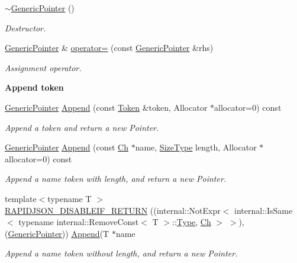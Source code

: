 \begin{Indent}
\begin{DoxyCompactItemize}
\mbox{\label{a02232_acf3eb2f7c4ebf9256f638aafa17534cb}} 
\hyperlink{a02232_acf3eb2f7c4ebf9256f638aafa17534cb}{$\sim$\+Generic\+Pointer} ()
\begin{DoxyCompactList}\small\item\em Destructor. \end{DoxyCompactList}\item 
\mbox{\label{a02232_a1d0174a6e72daa4024da9e08ce1e7951}} 
\hyperlink{a02232}{Generic\+Pointer} \& \hyperlink{a02232_a1d0174a6e72daa4024da9e08ce1e7951}{operator=} (const \hyperlink{a02232}{Generic\+Pointer} \&rhs)
\begin{DoxyCompactList}\small\item\em Assignment operator. \end{DoxyCompactList}\end{DoxyCompactItemize}
\end{Indent}
\begin{Indent}\textbf{ Append token}\par
\begin{DoxyCompactItemize}
\item 
\hyperlink{a02232}{Generic\+Pointer} \hyperlink{a02232_aa8f86c0f330807f337351a95ae254b78}{Append} (const \hyperlink{a02308}{Token} \&token, Allocator $\ast$allocator=0) const
\begin{DoxyCompactList}\small\item\em Append a token and return a new Pointer. \end{DoxyCompactList}\item 
\hyperlink{a02232}{Generic\+Pointer} \hyperlink{a02232_a9f8a1711f5b8e0d951c25c6c65326f77}{Append} (const \hyperlink{a02232_ab292356c11b4015c98d21b966b11f285}{Ch} $\ast$name, \hyperlink{a00560_a5ed6e6e67250fadbd041127e6386dcb5}{Size\+Type} length, Allocator $\ast$allocator=0) const
\begin{DoxyCompactList}\small\item\em Append a name token with length, and return a new Pointer. \end{DoxyCompactList}\item 
{\footnotesize template$<$typename T $>$ }\\\hyperlink{a02232_aaf4d7d852098878d24188d134182d42f}{R\+A\+P\+I\+D\+J\+S\+O\+N\+\_\+\+D\+I\+S\+A\+B\+L\+E\+I\+F\+\_\+\+R\+E\+T\+U\+RN} ((internal\+::\+Not\+Expr$<$ internal\+::\+Is\+Same$<$ typename internal\+::\+Remove\+Const$<$ T $>$\+::\hyperlink{a00560_a1d1cfd8ffb84e947f82999c682b666a7}{Type}, \hyperlink{a02232_ab292356c11b4015c98d21b966b11f285}{Ch} $>$ $>$),(\hyperlink{a02232}{Generic\+Pointer})) \hyperlink{a02232_aa8f86c0f330807f337351a95ae254b78}{Append}(T $\ast$name
\begin{DoxyCompactList}\small\item\em Append a name token without length, and return a new Pointer. \end{DoxyCompactList}\end{DoxyCompactItemize}
\end{Indent}
